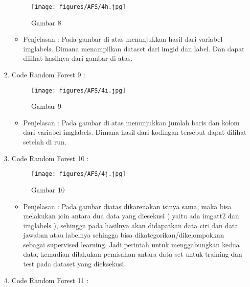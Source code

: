 \begin{enumerate}
\begin{figure}[ht]
\centering
\texttt{[image: figures/AFS/4h.jpg]}
\caption{Gambar 8}
\label{contoh}
\end{figure}
\par
\begin{itemize}
\item Penjelasan : Pada gambar di atas menunjukkan hasil dari variabel imglabels. Dimana menampilkan dataset dari imgid dan label. Dan dapat dilihat hasilnya dari gambar di atas.
\par
\par
\end{itemize}
\item Code Random Forest 9 :
\par
\begin{figure}[ht]
\centering
\texttt{[image: figures/AFS/4i.jpg]}
\caption{Gambar 9}
\label{contoh}
\end{figure}
\par
\begin{itemize}
\item Penjelasan : Pada gambar di atas menunjukkan jumlah baris dan kolom dari variabel imglabels. Dimana hasil dari kodingan tersebut dapat dilihat setelah di run. 
\par
\par
\end{itemize}
\item Code Random Forest 10 :
\par
\begin{figure}[ht]
\centering
\texttt{[image: figures/AFS/4j.jpg]}
\caption{Gambar 10}
\label{contoh}
\end{figure}
\par
\begin{itemize}
\item Penjelasan : Pada gambar diatas dikarenakan isinya sama, maka bisa melakukan join antara dua data yang diesekusi ( yaitu ada imgatt2 dan imglabels ), sehingga pada hasilnya akan didapatkan data ciri dan data jawaban atau labelnya sehingga bisa dikategorikan/dikelompokkan sebagai supervised learning. Jadi perintah untuk menggabungkan kedua data, kemudian dilakukan pemisahan antara data set untuk training dan test pada dataset yang dieksekusi.
\par
\par
\end{itemize}
\item Code Random Forest 11 :
\par

\end{enumerate}
